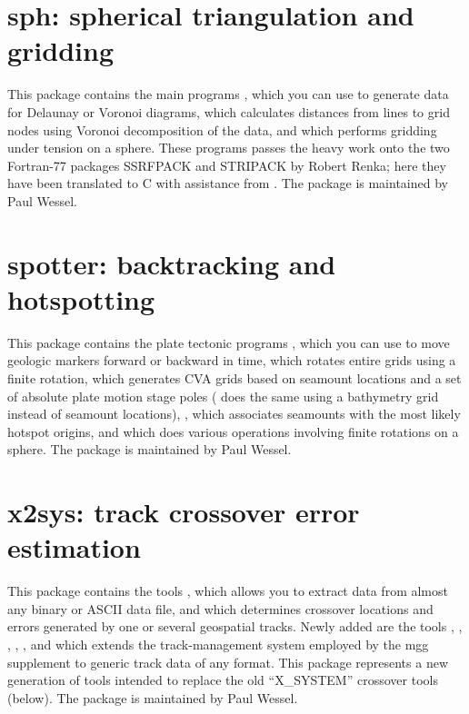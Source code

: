 \section{sph: spherical triangulation and gridding}

This package contains the main programs ,
which you can use to generate data for Delaunay or Voronoi diagrams, 
 which calculates distances from lines to grid
nodes using Voronoi decomposition of the data, and
 which performs gridding under tension on
a sphere.  These programs passes the heavy work onto the two Fortran-77
packages SSRFPACK and STRIPACK by Robert Renka; here they have been
translated to C with assistance from .
The package is maintained by Paul Wessel.

\section{spotter: backtracking and hotspotting}

This package contains the plate tectonic programs ,
which you can use to move geologic markers forward or backward in time, 
 which rotates entire grids using a finite rotation,
 which generates CVA grids based on seamount locations
and a set of absolute plate motion stage poles ( does the
same using a bathymetry grid instead of seamount locations), ,
which associates seamounts with the most likely hotspot origins, and 
which does various operations involving finite rotations on a sphere.  The package
is maintained by Paul Wessel.

\section{x2sys: track crossover error estimation}

This package contains the tools ,
which allows you to extract data from almost any binary or ASCII
data file, and  which determines crossover
locations and errors generated by one or several geospatial tracks.
Newly added are the tools ,  ,
, , ,
 and  which extends the track-management system
employed by the mgg supplement to generic track data of any format.
This package represents a new generation of tools intended to replace the old
``X\_SYSTEM'' crossover tools (below).  The package is maintained
by Paul Wessel.

